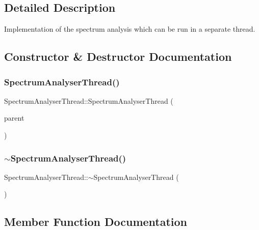 \subsection{Detailed Description}
Implementation of the spectrum analysis which can be run in a separate thread. 

\subsection{Constructor \& Destructor Documentation}
\hypertarget{class_spectrum_analyser_thread_a35109a92c671b97f2cdaef0dcc5ab6c2}{}\label{class_spectrum_analyser_thread_a35109a92c671b97f2cdaef0dcc5ab6c2} 
\subsubsection{\texorpdfstring{Spectrum\+Analyser\+Thread()}{SpectrumAnalyserThread()}}
{\footnotesize\ttfamily Spectrum\+Analyser\+Thread\+::\+Spectrum\+Analyser\+Thread (\begin{DoxyParamCaption}\item[{Q\+Object $\ast$}]{parent }\end{DoxyParamCaption})}

\hypertarget{class_spectrum_analyser_thread_a5d8f22dd659e87447f29bb7271a5f289}{}\label{class_spectrum_analyser_thread_a5d8f22dd659e87447f29bb7271a5f289} 
\subsubsection{\texorpdfstring{$\sim$\+Spectrum\+Analyser\+Thread()}{~SpectrumAnalyserThread()}}
{\footnotesize\ttfamily Spectrum\+Analyser\+Thread\+::$\sim$\+Spectrum\+Analyser\+Thread (\begin{DoxyParamCaption}{ }\end{DoxyParamCaption})}



\subsection{Member Function Documentation}
\hypertarget{class_spectrum_analyser_thread_a6dc32705bf41e75f8d16f9c27bd2ee65}{}\label{class_spectrum_analyser_thread_a6dc32705bf41e75f8d16f9c27bd2ee65} 
